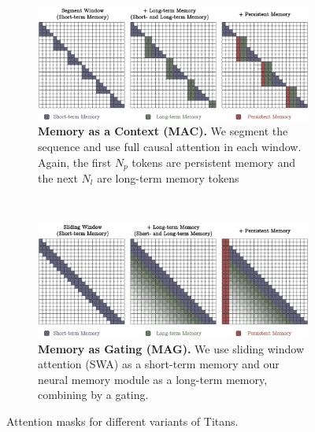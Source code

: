 \begin{figure}[t!]
    \centering
    \begin{subfigure}{0.48\linewidth}
        \includegraphics[width=\linewidth]{Figures/MAC.png}
    \caption{\textbf{Memory as a Context (MAC).} We segment the sequence and use full causal attention in each window. Again, the first $N_p$ tokens are persistent memory and the next $N_{l}$ are long-term memory tokens}
    \label{fig:MAC-attention}
    \end{subfigure}~\hfill
    \centering~
    \begin{subfigure}{0.48\linewidth}
        \includegraphics[width=\linewidth]{Figures/MAG.png}
    \caption{\textbf{Memory as Gating (MAG).} We use sliding window attention (SWA) as a short-term memory and our neural memory module as a long-term memory, combining by a gating.}
    \label{fig:MAG-attention}
    \end{subfigure}
    \caption{Attention masks for different variants of Titans.}
\end{figure}


